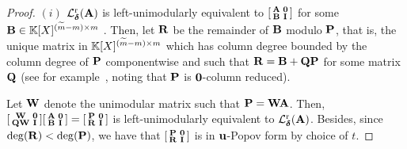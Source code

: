 \documentclass[preprint]{sig-alternate-05-2015}
\begin{document}
\begin{proof}
  $(i)$
  $\rowParLin{\minDegs}{\mat{A}}$ is left-unimodularly equivalent to 
  $[\begin{smallmatrix}
    \mat{A} & \mathbf{0} \\
    \mat{B} & \idMat[]
  \end{smallmatrix}]$
  for some $\mat{B} \in \polMatSpace[(\expand{\rdim}-\rdim)][\rdim]$
  \cite[Theorem 10 (i)]{GuSaStVa12}.
  Then, let $\mat{R}$ be the remainder of $\mat{B}$ modulo $\popov$, that is,
  the unique matrix in $\polMatSpace[(\expand{\rdim}-\rdim)][\rdim]$ which has
  column degree bounded by the column degree of $\popov$
  componentwise and such that $\mat{R} = \mat{B} + \mat{Q}\popov$ for some
  matrix $\mat{Q}$ (see for example~\cite[Theorem~6.3-15]{Kailath80}, noting
  that $\popov$ is $\unishift$-column reduced).

  Let $\mat{W}$ denote the unimodular matrix such that $\popov = \mat{W}
  \mat{A}$. Then, 
  $[\begin{smallmatrix}
    \mat{W} & \mathbf{0} \\
    \mat{Q}\mat{W}  & \idMat[]
  \end{smallmatrix}]
  [\begin{smallmatrix}
    \mat{A} & \mathbf{0} \\
    \mat{B} & \idMat[]
  \end{smallmatrix}]
  =
  [\begin{smallmatrix}
    \popov & \mathbf{0} \\
    \mat{R} & \idMat[]
  \end{smallmatrix}]$
  is left-unimodularly equivalent to $\rowParLin{\minDegs}{\mat{A}}$.
  Besides, since
  $\deg(\mat{R}) < \deg(\popov)$, we have that
  $[\begin{smallmatrix}
    \popov & \mathbf{0} \\
    \mat{R} & \idMat[]
  \end{smallmatrix}]$
  is in $\shifts[u]$-Popov form by choice of $t$.


\end{proof}
\end{document}
